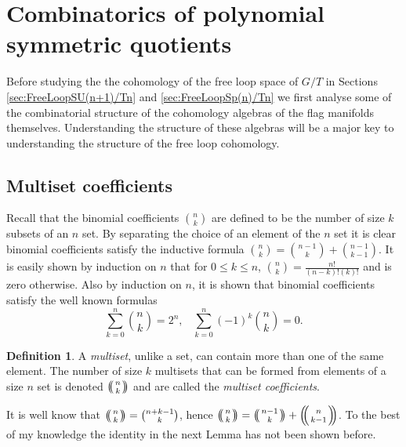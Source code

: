 \documentclass{article}
\theoremstyle{plain}
\theoremstyle{definition}
\newtheorem{defn}[thm]{Definition}
\numberwithin{thm}{section}
\begin{document}
\newpage
\section{Combinatorics of polynomial symmetric quotients}\label{sec:CombiSQ}
		
		Before studying the the cohomology of the free loop space of $G/T$ in Sections \ref{sec:FreeLoopSU(n+1)/Tn} and \ref{sec:FreeLoopSp(n)/Tn}
		we first analyse some of the combinatorial structure of the cohomology algebras of the flag manifolds themselves.
		Understanding the structure of these algebras will be a major key to understanding the structure of the free loop cohomology.
		
		\subsection{Multiset coefficients}\label{subsec:MultiSet} 
		
			Recall that the binomial coefficients $\binom{n}{k}$ are defined to be the number of size $k$ subsets of an $n$ set.
			By separating the choice of an element of the $n$ set it is clear binomial coefficients satisfy the inductive formula $\binom{n}{k}=\binom{n-1}{k}+\binom{n-1}{k-1}$.
			It is easily shown by induction on $n$ that for $0\leq k \leq n$, $\binom{n}{k}=\frac{n!}{(n-k)!(k)!}$ and is zero otherwise.
			Also by induction on $n$, it is shown that binomial coefficients satisfy the well known formulas
			\begin{equation}\label{eq:binom}
				\sum_{k=0}^n{\binom{n}{k}}=2^n, \;\;\; \sum^{n}_{k=0}{(-1)^k \binom{n}{k}}=0.
			\end{equation}
		
			\begin{defn}\label{def:MutiSet}
				A {\it multiset}, unlike a set, can contain more than one of the same element. 
				The number of size $k$ multisets that can be formed from elements of a size $n$ set is denoted ${\ensuremath{\left(\kern-.3em\left(\genfrac{}{}{0pt}{}{{n}}{{k}}\right)\kern-.3em\right)}}$ and are called the {\it multiset coefficients}.
			\end{defn}
			
			It is well know that ${\ensuremath{\left(\kern-.3em\left(\genfrac{}{}{0pt}{}{{n}}{{k}}\right)\kern-.3em\right)}}=\binom{n+k-1}{k}$,
			hence ${\ensuremath{\left(\kern-.3em\left(\genfrac{}{}{0pt}{}{{n}}{{k}}\right)\kern-.3em\right)}}={\ensuremath{\left(\kern-.3em\left(\genfrac{}{}{0pt}{}{{n-1}}{{k}}\right)\kern-.3em\right)}}+{\ensuremath{\left(\kern-.3em\left(\genfrac{}{}{0pt}{}{{n}}{{k-1}}\right)\kern-.3em\right)}}$.
			To the best of my knowledge the identity in the next Lemma has not been shown before.
			
\end{document}
